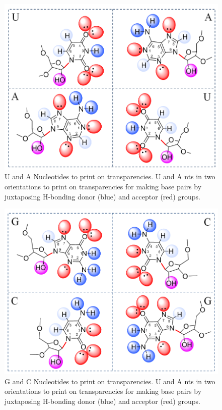\begin{figure}
  \includegraphics[width=\linewidth]{chapter-1/figs/ua}
  \caption{U and A Nucleotides to print on transparencies. U and A nts in two
    orientations to print on transparencies for making base pairs by juxtaposing
  H-bonding donor (blue) and acceptor (red) groups. }
  \label{fig:ua}
\end{figure}

\begin{figure}
  \includegraphics[width=\linewidth]{chapter-1/figs/gc}
  \caption{G and C Nucleotides to print on transparencies. U and A nts in two
    orientations to print on transparencies for making base pairs by juxtaposing
  H-bonding donor (blue) and acceptor (red) groups.}
  \label{fig:gc}
\end{figure}


